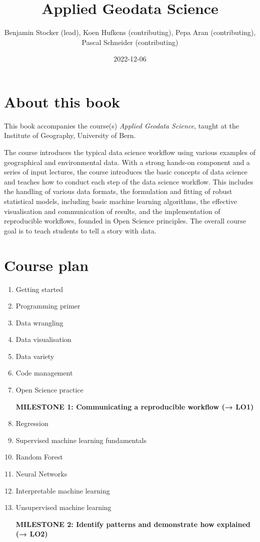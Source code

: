 \documentclass[
]{book}
\title{Applied Geodata Science}
\author{Benjamin Stocker (lead), Koen Hufkens (contributing), Pepa Aran (contributing), Pascal Schneider (contributing)}
\date{2022-12-06}
\begin{document}
\maketitle

{
\setcounter{tocdepth}{1}
\tableofcontents
}
\hypertarget{about-this-book}{%
\chapter*{About this book}\label{about-this-book}}

This book accompanies the course(s) \emph{Applied Geodata Science}, taught at the Institute of Geography, University of Bern.

The course introduces the typical data science workflow using various examples of geographical and environmental data. With a strong hands-on component and a series of input lectures, the course introduces the basic concepts of data science and teaches how to conduct each step of the data science workflow. This includes the handling of various data formats, the formulation and fitting of robust statistical models, including basic machine learning algorithms, the effective visualisation and communication of results, and the implementation of reproducible workflows, founded in Open Science principles. The overall course goal is to teach students to tell a story with data.

\hypertarget{course-plan}{%
\chapter*{Course plan}\label{course-plan}}

\begin{enumerate}
\def\labelenumi{\arabic{enumi}.}
\item
  Getting started
\item
  Programming primer
\item
  Data wrangling
\item
  Data visualisation
\item
  Data variety
\item
  Code management
\item
  Open Science practice

  \textbf{MILESTONE 1: Communicating a reproducible workflow (→ LO1)}
\item
  Regression
\item
  Supervised machine learning fundamentals
\item
  Random Forest
\item
  Neural Networks
\item
  Interpretable machine learning
\item
  Unsupervised machine learning

  \textbf{MILESTONE 2: Identify patterns and demonstrate how explained (→ LO2)}
\end{enumerate}
\end{document}

